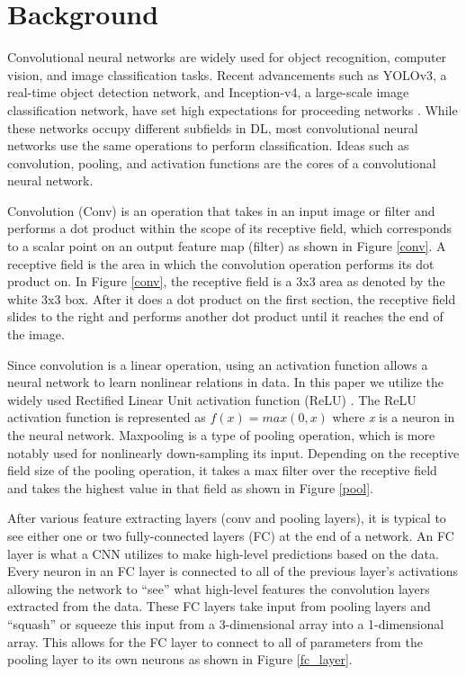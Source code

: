 \documentclass{osa-article}
\begin{document}
\section{Background}
Convolutional neural networks are widely used for object recognition, computer vision, and image classification tasks. Recent advancements such as YOLOv3, a real-time object detection network, and Inception-v4, a large-scale image classification network, have set high expectations for proceeding networks \cite{DBLP:journals/corr/abs-1804-02767, DBLP:journals/corr/SzegedyIV16}. While these networks occupy different subfields in DL, most convolutional neural networks use the same operations to perform classification. Ideas such as convolution, pooling, and activation functions are the cores of a convolutional neural network. \par
Convolution (Conv) is an operation that takes in an input image or filter and performs a dot product within the scope of its receptive field, which corresponds to a scalar point on an output feature map (filter) as shown in Figure \ref{conv}. A receptive field is the area in which the convolution operation performs its dot product on. In Figure \ref{conv}, the receptive field is a 3x3 area as denoted by the white 3x3 box. After it does a dot product on the first section, the receptive field slides to the right and performs another dot product until it reaches the end of the image.\par
Since convolution is a linear operation, using an activation function allows a neural network to learn nonlinear relations in data. In this paper we utilize the widely used Rectified Linear Unit activation function (ReLU) \cite{Nair:2010:RLU:3104322.3104425}. The ReLU activation function is represented as $f(x) = max(0, x) $ where \textit{x} is a neuron in the neural network. Maxpooling is a type of pooling operation, which is more notably used for nonlinearly down-sampling its input. Depending on the receptive field size of the pooling operation, it takes a max filter over the receptive field and takes the highest value in that field as shown in Figure \ref{pool}. \par
After various feature extracting layers (conv and pooling layers), it is typical to see either one or two fully-connected layers (FC) at the end of a network. An FC layer is what a CNN utilizes to make high-level predictions based on the data. Every neuron in an FC layer is connected to all of the previous layer's activations allowing the network to ``see'' what high-level features the convolution layers extracted from the data. These FC layers take input from pooling layers and ``squash'' or squeeze this input from a 3-dimensional array into a 1-dimensional array. This allows for the FC layer to connect to all of parameters from the pooling layer to its own neurons as shown in Figure \ref{fc_layer}.\par
\end{document}
